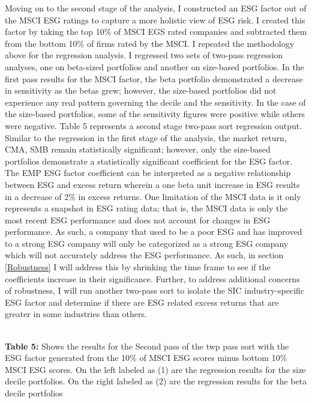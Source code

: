 Moving on to the second stage of the analysis, I constructed an ESG factor out of the MSCI ESG ratings to capture a more holistic view of ESG risk. I created this factor by taking the top 10\% of MSCI EGS rated companies and subtracted them from the bottom 10\% of firms rated by the MSCI. I repeated the methodology above for the regression analysis. I  regressed two sets of two-pass regression analyses, one on beta-sized portfolios and another on size-based portfolios. In the first pass results for the MSCI factor, the beta portfolio demonstrated a decrease in sensitivity as the betas grew; however, the size-based portfolios did not experience any real pattern governing the decile and the sensitivity. In the case of the size-based portfolios, some of the sensitivity figures were positive while others were negative. Table 5 represents a second stage two-pass sort regression output. Similar to the regression in the first stage of the analysis, the market return, CMA, SMB remain statistically significant; however, only the size-based portfolios demonstrate a statistically significant coefficient for the ESG factor.  The EMP ESG factor coefficient can be interpreted as a negative relationship between ESG and excess return wherein a one beta unit increase in ESG results in a decrease of 2\% in excess returns. One limitation of the MSCI data is it only represents a snapshot in ESG rating data; that is, the MSCI data is only the most recent ESG performance and does not account for changes in ESG performance. As such, a company that used to be a  poor ESG and has improved to a strong ESG company will only be categorized as a strong ESG company which will not accurately address the ESG performance.  As such, in section \ref{Robustness} I will address this by shrinking the time frame to see if the coefficients increase in their significance. Further,  to address additional concerns of robustness, I will run another two-pass sort to isolate the SIC industry-specific ESG factor and determine if there are ESG related excess returns that are greater in some industries than others. 

\begin{center}
    \paperspacingnarrow
    
    \\
    \textbf{Table 5:} Shows the results for the Second pass of the twp pass sort with the ESG factor generated from the 10\% of MSCI ESG scores minus bottom 10\% MSCI ESG scores. On the left labeled as (1) are the regression results for the size decile portfolios. On the right labeled as (2) are the regression results for the beta decile portfolios
    
    \paperspacingwide
\end{center}